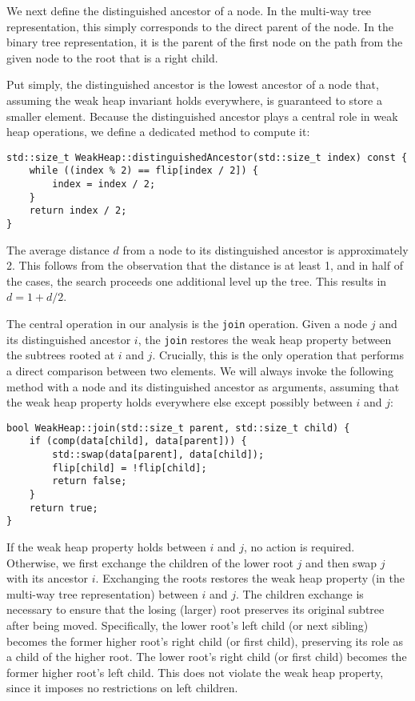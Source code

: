We next define the distinguished ancestor of a node. In the multi-way tree representation, this simply corresponds to the direct parent of the node. In the binary tree representation, it is the parent of the first node on the path from the given node to the root that is a right child. 

Put simply, the distinguished ancestor is the lowest ancestor of a node that, assuming the weak heap invariant holds everywhere, is guaranteed to store a smaller element. Because the distinguished ancestor plays a central role in weak heap operations, we define a dedicated method to compute it:

\begin{verbatim}
std::size_t WeakHeap::distinguishedAncestor(std::size_t index) const {
    while ((index % 2) == flip[index / 2]) {
        index = index / 2;
    }
    return index / 2;
}
\end{verbatim}

The average distance \({d}\) from a node to its distinguished ancestor is approximately 2. This follows from the observation that the distance is at least 1, and in half of the cases, the search proceeds one additional level up the tree. This results in \(d = 1 + d/2\). 

The central operation in our analysis is the \texttt{join} operation. Given a node \(j\) and its distinguished ancestor \(i\), the \texttt{join} restores the weak heap property between the subtrees rooted at \(i\) and \(j\). Crucially, this is the only operation that performs a direct comparison between two elements. We will always invoke the following method with a node and its distinguished ancestor as arguments, assuming that the weak heap property holds everywhere else except possibly between \(i\) and \(j\):

\begin{verbatim}
bool WeakHeap::join(std::size_t parent, std::size_t child) {
    if (comp(data[child], data[parent])) {
        std::swap(data[parent], data[child]);
        flip[child] = !flip[child];
        return false;
    }
    return true;
}
\end{verbatim}

If the weak heap property holds between \(i\) and \(j\), no action is required. Otherwise, we first exchange the children of the lower root \(j\) and then swap \(j\) with its ancestor \(i\). Exchanging the roots restores the weak heap property (in the multi-way tree representation) between \(i\) and \(j\). The children exchange is necessary to ensure that the losing (larger) root preserves its original subtree after being moved. Specifically, the lower root’s left child (or next sibling) becomes the former higher root’s right child (or first child), preserving its role as a child of the higher root. The lower root’s right child (or first child) becomes the former higher root’s left child. This does not violate the weak heap property, since it imposes no restrictions on left children.

